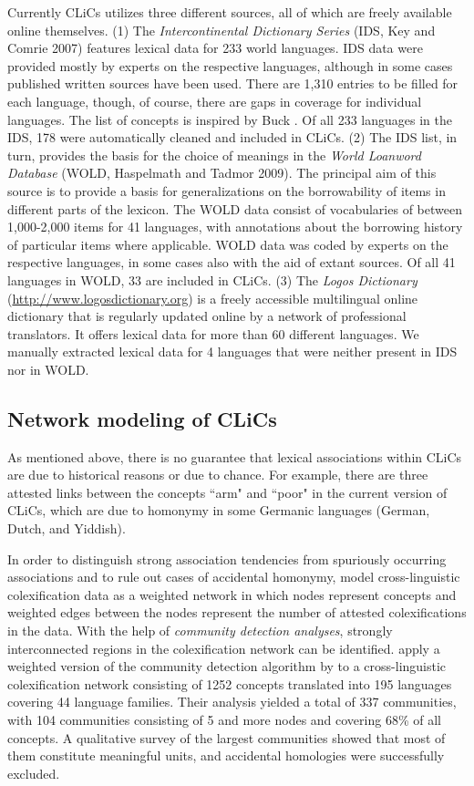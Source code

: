 Currently CLiCs utilizes three different sources, all of which are freely available online
themselves.  (1) The \emph{Intercontinental Dictionary Series} (IDS, Key and Comrie 2007) 
\nocite{Key2007} features lexical
data for 233 world languages. IDS data were provided mostly by experts on the respective languages,
although in some cases published written sources have been used. There are 1,310 entries to be
filled for each language, though, of course, there are gaps in coverage for individual languages.
The list of concepts is inspired by Buck . Of all 233 languages in the IDS, 178 were
automatically cleaned and included in CLiCs.  (2) The IDS list, in turn, provides the basis for the
choice of meanings in the \emph{World Loanword Database} (WOLD, Haspelmath and Tadmor 2009).
\nocite{Wold2009} The principal aim
of this source is to provide a basis for generalizations on the borrowability of items in different
parts of the lexicon. The WOLD data consist of vocabularies of between 1,000-2,000 items for 41
languages, with annotations about the borrowing history of particular items where applicable. WOLD
data was coded by experts on the respective languages, in some cases also with the aid of extant
sources. Of all 41 languages in WOLD, 33 are included in CLiCs.  (3) The \emph{Logos Dictionary}
(\url{http://www.logosdictionary.org}) is a freely accessible multilingual online dictionary that is
regularly updated online by a network of professional translators. It offers lexical data for more
than 60 different languages. We manually extracted lexical data for 4 languages that were neither
present in IDS nor in WOLD. 


\subsection{Network modeling of CLiCs}
As mentioned above, there is no guarantee that lexical associations within CLiCs are due to
historical reasons or due to chance. For example, there are three attested links between the
concepts ``arm" and ``poor" in the current version of CLiCs, which are due to homonymy in some
Germanic languages (German, Dutch, and Yiddish).
 
In order to distinguish strong
association tendencies from
spuriously occurring associations and to rule out cases of accidental homonymy,  model cross-linguistic colexification data as a weighted network
in which nodes represent concepts and weighted edges between the nodes represent the number of
attested colexifications in the data.  With the help of \emph{community detection analyses}, strongly
interconnected regions in the colexification network can be identified.  apply
a weighted version of the community detection algorithm by  to a
cross-linguistic colexification network consisting of 1252 concepts translated into 195 languages
covering 44 language families. Their analysis yielded a total of 337 communities, with 104 communities
consisting of 5 and more nodes and covering 68\% of all concepts. A qualitative survey of the
largest communities showed that most of them constitute meaningful units, and accidental homologies
were successfully excluded.
